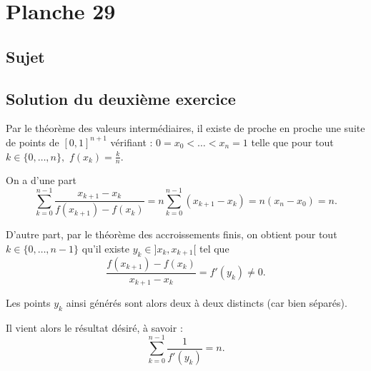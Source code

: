 \chapter{Planche 29}

\section{Sujet}

\section{Solution du deuxième exercice}

Par le théorème des valeurs intermédiaires, il existe de proche en proche une suite de points de $[0,1]^{n+1}$ vérifiant : $0=x_{0}<\ldots<x_{n}=1$ telle que pour tout $k\in\{0,\ldots,n\},$ $\displaystyle f(x_{k})=\frac{k}{n}.$

On a d'une part $$\sum_{k=0}^{n-1}\frac{x_{k+1}-x_{k}}{f(x_{k+1})-f(x_{k})}=n\sum_{k=0}^{n-1}\left(x_{k+1}-x_{k}\right)=n(x_{n}-x_{0})=n.$$

D'autre part, par le théorème des accroissements finis, on obtient pour tout $k\in\{0,\ldots,n-1\}$ qu'il existe $y_{k}\in ]x_{k},x_{k+1}[$ tel que $$\frac{f(x_{k+1})-f(x_{k})}{x_{k+1}-x_{k}}=f'(y_{k})\neq 0.$$

Les points $y_{k}$ ainsi générés sont alors deux à deux distincts (car bien séparés).

Il vient alors le résultat désiré, à savoir : $$\sum_{k=0}^{n-1}\frac{1}{f'(y_{k})}=n.$$